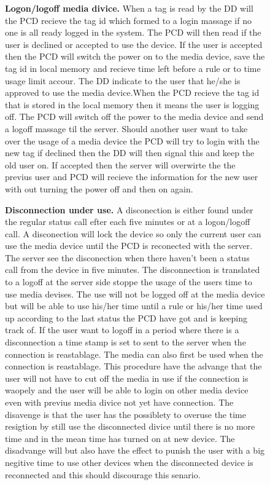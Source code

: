 \begin{figure}[h]
\textbf{Logon/logoff media divice.} \newline
When a tag is read by the DD will the PCD recieve the tag id which formed to a login massage if no one is all ready logged in the system. The PCD will then read if the user is declined or accepted to use the device. If the user is accepted then the PCD will switch the power on to the media device, save the tag id in local memory and recieve time left before a rule or to time usage limit accour. The DD indicate to the user that he/she is approved to use the media device.\newline When the PCD recieve the tag id that is stored in the local memory then it means the user is logging off. The PCD will switch off the power to the media device and send a logoff massage til the server. Should another user want to take over the usage of a media device the PCD will try to login with the new tag if declined then the DD will then signal this and keep the old user on. If accepted then the server will overwirte the the previus user and PCD will recieve the information for the new user with out turning the power off and then on again.\newline


\textbf{Disconnection under use.} \newline
A disconection is either found under the regular status call efter each five minutes or at a logon/logoff call. A disconection will lock the device so only the current user can use the media device until the PCD is reconected with the server. The server see the disconection when there haven't been a status call from the device in five minutes. The disconnection is translated to a logoff at the server side stoppe the usage of the users time to use media devises. The use will not be logged off at the media device but will be able to use his/her time until a rule or his/her time used up according to the last status the PCD have got and is keeping track of. If the user want to logoff in a period where there is a disconnection a time stamp is set to sent to the server when the connection is reastablage. The media can also first be used when the connection is reastablage.   
This procedure have the advange that the user will not have to cut off the media in use if the connection is waopely and the user will be able to login on other media device even with previus media divice not yet have connection. 
The disavenge is that the user has the possiblety to overuse the time resigtion by still use the disconnected divice until there is no more time and in the mean time has turned on at new device. 
The disadvange will but also have the effect to punish the user with a big negitive time to use other devices when the disconnected device is reconnected and this should discourage this senario.       
    

\end{figure}

